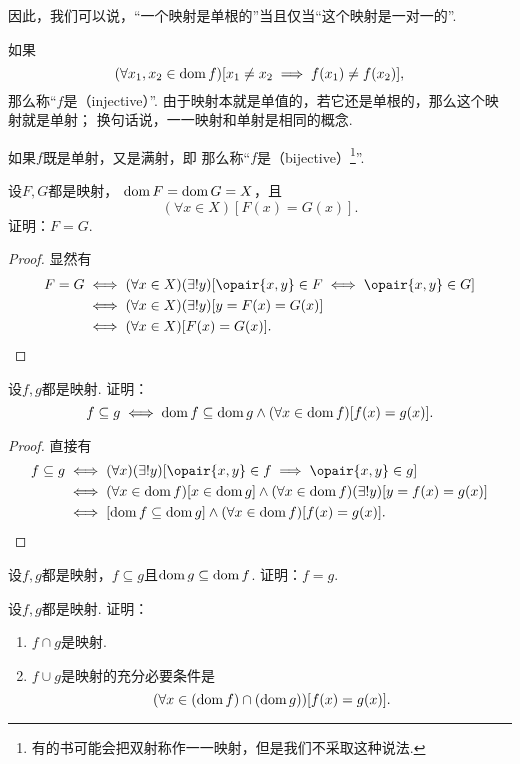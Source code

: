 因此，我们可以说，“一个映射是单根的”当且仅当“这个映射是一对一的”.

如果\[
	(\forall x_1, x_2 \in \operatorname{dom} f)
	[x_1 \neq x_2 \implies f(x_1) \neq f(x_2)],
\]
那么称“\(f\)是（injective）”.
由于映射本就是单值的，若它还是单根的，那么这个映射就是单射；
换句话说，一一映射和单射是相同的概念.

如果\(f\)既是单射，又是满射，即
那么称“\(f\)是（bijective）\footnote{%
有的书可能会把双射称作一一映射，但是我们不采取这种说法.
}”.

\begin{example}
设\(F,G\)都是映射，
\(\operatorname{dom} F = \operatorname{dom} G = X\)，且\[
	(\forall x \in X)[F(x) = G(x)].
\]
证明：\(F=G\).
\begin{proof}
显然有
\begin{align*}
	F=G
	&\iff (\forall x \in X)(\exists!y)[
		\opair{x,y} \in F
		\iff
		\opair{x,y} \in G
	] \\
	&\iff (\forall x \in X)(\exists!y)[
		y = F(x) = G(x)
	] \\
	&\iff (\forall x \in X)[F(x) = G(x)].
	\qedhere
\end{align*}
\end{proof}
\end{example}

\begin{example}
设\(f,g\)都是映射.
证明：\[
	f \subseteq g
	\iff
	\operatorname{dom} f \subseteq \operatorname{dom} g
	\land
	(\forall x \in \operatorname{dom} f)
	[f(x) = g(x)].
\]
\begin{proof}
直接有
\begin{align*}
	f \subseteq g
	&\iff (\forall x)(\exists!y)[\opair{x,y} \in f \implies \opair{x,y} \in g] \\
	&\iff (\forall x \in \dom f)[x \in \dom g]\land(\forall x \in \dom f)(\exists!y)[y=f(x)=g(x)] \\
	&\iff [\dom f \subseteq \dom g]\land(\forall x \in \dom f)[f(x)=g(x)].
	\qedhere
\end{align*}
\end{proof}
\end{example}

\begin{example}
设\(f,g\)都是映射，\(f \subseteq g\)且\(\operatorname{dom} g \subseteq \operatorname{dom} f\).
证明：\(f=g\).
\end{example}

\begin{example}
设\(f,g\)都是映射.
证明：
\begin{enumerate}
	\item \(f \cap g\)是映射.
	\item \(f \cup g\)是映射的充分必要条件是\[
		(\forall x \in (\operatorname{dom} f)\cap(\operatorname{dom} g))[f(x)=g(x)].
	\]
\end{enumerate}
\end{example}

